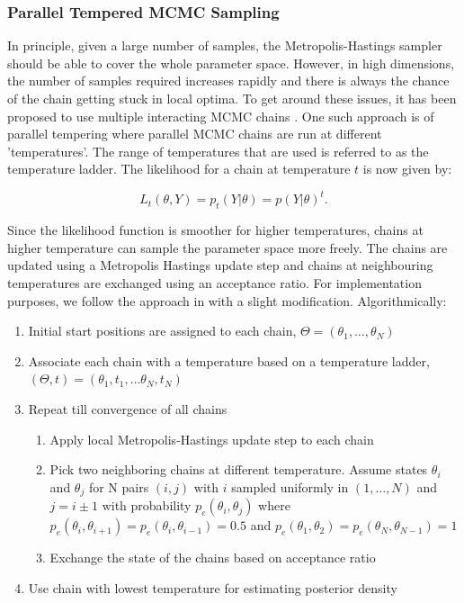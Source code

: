 \subsubsection{Parallel Tempered MCMC Sampling}

In principle, given a large number of samples, the Metropolis-Hastings sampler should be able to cover the whole parameter space. However, in high dimensions, the number of samples required increases rapidly and there is always the chance of the chain getting stuck in local optima. To get around these issues, it has been proposed to use multiple interacting MCMC chains \cite{geyer91}. One such approach is of parallel tempering where parallel MCMC chains are run at different 'temperatures'. The range of temperatures that are used is referred to as the temperature ladder. The likelihood for a chain at temperature $t$ is now given by:

$$L_{t}(\theta, Y) = p_{t}(Y| \theta) = p(Y| \theta)^{t}.$$

Since the likelihood function is smoother for higher temperatures, chains at higher temperature can sample the parameter space more freely. The chains are updated using a Metropolis Hastings update step and chains at neighbouring temperatures are exchanged using an acceptance ratio. For implementation purposes, we follow the approach in \cite{calderhead12} with a slight modification. Algorithmically:

\begin{enumerate}
\item Initial start positions are assigned to each chain, $\Theta = (\theta_{1}, \ldots, \theta_{N})$
\item Associate each chain with a temperature based on a temperature ladder, $(\Theta, t) = (\theta_{1}, t_{1}, \ldots \theta_{N}, t_{N})$
\item Repeat till convergence of all chains
\begin{enumerate}
\item Apply local Metropolis-Hastings update step to each chain
\item Pick two neighboring chains at different temperature. Assume states $\theta_{i}$ and $\theta_{j}$ for N pairs $(i, j)$ with $i$ sampled uniformly in $(1, \ldots , N)$ and $j=i \pm 1$ with probability $p_{e}(\theta_i, \theta_j)$ where $p_{e}(\theta_i, \theta_{i+1}) = p_{e}(\theta_i, \theta_{i-1}) = 0.5$ and $p_{e}(\theta_{1}, \theta_2) = p_{e}(\theta_{N}, \theta_{N-1}) = 1$
\item Exchange the state of the chains based on acceptance ratio
\end{enumerate}
\item Use chain with lowest temperature for estimating posterior density
\end{enumerate}

